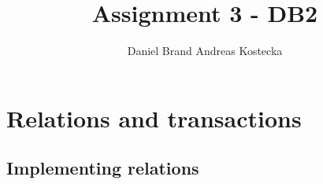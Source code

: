 \documentclass{vldb}
\begin{document}

\title{Assignment 3 - DB2}



\author{
\alignauthor Daniel Brand
\alignauthor Andreas Kostecka
}

\maketitle

\section{Relations and transactions}

\subsection{Implementing relations}
\end{document}

